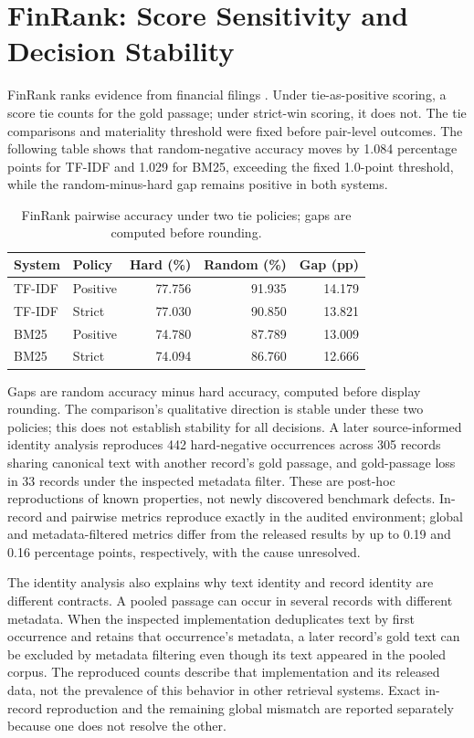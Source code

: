 \documentclass[runningheads]{llncs}
\begin{document}
\section{FinRank: Score Sensitivity and Decision
Stability}\label{finrank-score-sensitivity-and-decision-stability}

FinRank ranks evidence from financial filings \cite{r1}. Under
tie-as-positive scoring, a score tie counts for the gold passage; under
strict-win scoring, it does not. The tie comparisons and materiality
threshold were fixed before pair-level outcomes. The following table
shows that random-negative accuracy moves by 1.084 percentage points for
TF-IDF and 1.029 for BM25, exceeding the fixed 1.0-point threshold,
while the random-minus-hard gap remains positive in both systems.

\begin{table}[htbp]
\caption{FinRank pairwise accuracy under two tie policies; gaps are computed before rounding.}
\label{tab:finrank}
\centering
\begin{tabular}{llrrr}
\hline
System & Policy & Hard (\%) & Random (\%) & Gap (pp) \\
\hline
TF-IDF & Positive & 77.756 & 91.935 & 14.179 \\
TF-IDF & Strict & 77.030 & 90.850 & 13.821 \\
BM25 & Positive & 74.780 & 87.789 & 13.009 \\
BM25 & Strict & 74.094 & 86.760 & 12.666 \\
\hline
\end{tabular}
\end{table}

Gaps are random accuracy minus hard accuracy, computed before display
rounding. The comparison's qualitative direction is stable under these
two policies; this does not establish stability for all decisions. A
later source-informed identity analysis reproduces 442 hard-negative
occurrences across 305 records sharing canonical text with another
record's gold passage, and gold-passage loss in 33 records under the
inspected metadata filter. These are post-hoc reproductions of known
properties, not newly discovered benchmark defects. In-record and
pairwise metrics reproduce exactly in the audited environment; global
and metadata-filtered metrics differ from the released results by up to
0.19 and 0.16 percentage points, respectively, with the cause
unresolved.

The identity analysis also explains why text identity and record
identity are different contracts. A pooled passage can occur in several
records with different metadata. When the inspected implementation
deduplicates text by first occurrence and retains that occurrence's
metadata, a later record's gold text can be excluded by metadata
filtering even though its text appeared in the pooled corpus. The
reproduced counts describe that implementation and its released data,
not the prevalence of this behavior in other retrieval systems. Exact
in-record reproduction and the remaining global mismatch are reported
separately because one does not resolve the other.
\end{document}
